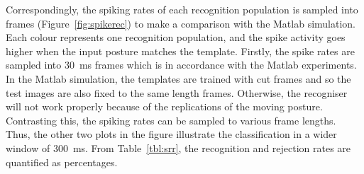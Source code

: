 Correspondingly, the spiking rates of each recognition population is sampled into frames (Figure~\ref{fig:spikerec}) to make a comparison with the Matlab simulation. 
Each colour represents one recognition population, and the spike activity goes higher when the input posture matches the template. 
Firstly, the spike rates are sampled into 30~ms frames which is in accordance with the Matlab experiments.
In the Matlab simulation, the templates are trained with cut frames and so the test images are also fixed to the same length frames.
Otherwise, the recogniser will not work properly because of the replications of the moving posture.
Contrasting this, the spiking rates can be sampled to various frame lengths.
Thus, the other two plots in the figure illustrate the classification in a wider window of 300~ms.
From Table~\ref{tbl:srr}, the recognition and rejection rates are quantified as percentages.

